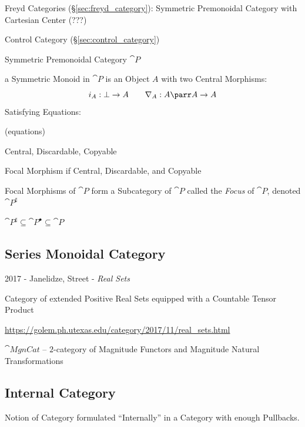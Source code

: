 Freyd Categories (\S\ref{sec:freyd_category}): Symmetric Premonoidal
Category with Cartesian Center (???)

Control Category (\S\ref{sec:control_category})

Symmetric Premonoidal Category $\cat{P}$

a Symmetric Monoid in $\cat{P}$ is an Object $A$ with two Central
Morphisms:
\[
  i_A : \bot \rightarrow A \quad\quad
  \nabla_A : A \parr A \rightarrow A
\]
Satisfying Equations:

(equations) %

Central, Discardable, Copyable

Focal Morphism if Central, Discardable, and Copyable

Focal Morphisms of $\cat{P}$ form a Subcategory of $\cat{P}$ called
the \emph{Focus} of $\cat{P}$, denoted $\cat{P}^\sharp$

$\cat{P}^\sharp \subseteq \cat{P}^\bullet \subseteq \cat{P}$



\subsection{Series Monoidal Category}\label{sec:series_meonoidal_category}


2017 - Janelidze, Street - \emph{Real Sets}

Category of extended Positive Real Sets equipped with a Countable Tensor
Product

\url{https://golem.ph.utexas.edu/category/2017/11/real_sets.html}

$\cat{MgnCat}$ -- $2$-category of Magnitude Functors and Magnitude Natural
Transformations



\subsection{Internal Category}\label{sec:internal_category}


Notion of Category formulated ``Internally'' in a Category with enough
Pullbacks.

